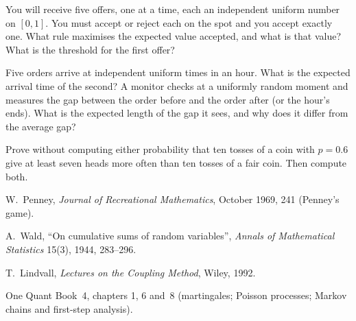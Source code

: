 \begin{interviewq}\label{iq:iv:probability-ii:12}
You will receive five offers, one at a time, each an independent uniform number on $[0,1]$. You must accept or
reject each on the spot and you accept exactly one. What rule maximises the expected value accepted, and what is
that value? What is the threshold for the first offer?
\end{interviewq}

\begin{interviewq}\label{iq:iv:probability-ii:13}
Five orders arrive at independent uniform times in an hour. What is the expected arrival time of the second? A
monitor checks at a uniformly random moment and measures the gap between the order before and the order after
(or the hour's ends). What is the expected length of the gap it sees, and why does it differ from the average
gap?
\end{interviewq}

\begin{interviewq}\label{iq:iv:probability-ii:14}
Prove without computing either probability that ten tosses of a coin with $p = 0.6$ give at least seven heads
more often than ten tosses of a fair coin. Then compute both.
\end{interviewq}

\begin{omsources}
\item W.~Penney, \emph{Journal of Recreational Mathematics}, October 1969, 241 (Penney's game).
\item A.~Wald, ``On cumulative sums of random variables'', \emph{Annals of Mathematical Statistics} 15(3),
1944, 283--296.
\item T.~Lindvall, \emph{Lectures on the Coupling Method}, Wiley, 1992.
\item One Quant Book~4, chapters 1, 6 and~8 (martingales; Poisson processes; Markov chains and first-step
analysis).
\end{omsources}
